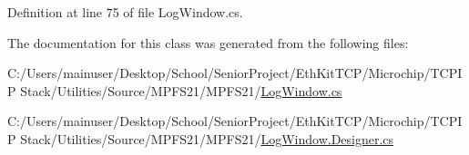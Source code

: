 Definition at line 75 of file Log\+Window.\+cs.



The documentation for this class was generated from the following files\+:\begin{DoxyCompactItemize}
\item 
C\+:/\+Users/mainuser/\+Desktop/\+School/\+Senior\+Project/\+Eth\+Kit\+T\+C\+P/\+Microchip/\+T\+C\+P\+I\+P Stack/\+Utilities/\+Source/\+M\+P\+F\+S21/\+M\+P\+F\+S21/\hyperlink{_log_window_8cs}{Log\+Window.\+cs}\item 
C\+:/\+Users/mainuser/\+Desktop/\+School/\+Senior\+Project/\+Eth\+Kit\+T\+C\+P/\+Microchip/\+T\+C\+P\+I\+P Stack/\+Utilities/\+Source/\+M\+P\+F\+S21/\+M\+P\+F\+S21/\hyperlink{_log_window_8_designer_8cs}{Log\+Window.\+Designer.\+cs}\end{DoxyCompactItemize}
